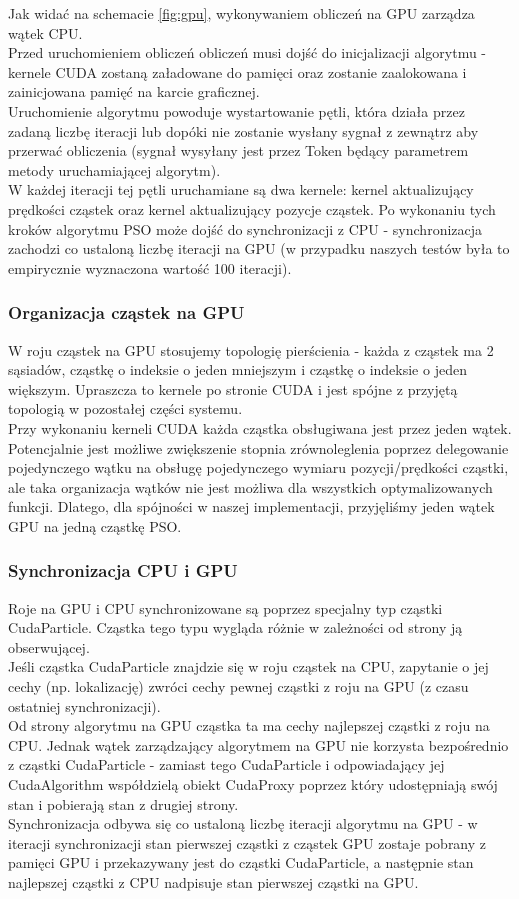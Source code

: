 \documentclass[12pt, twoside, openany, abstract=on]{report}
\theoremstyle{definition}
\begin{document}
  
Jak widać na schemacie \ref{fig:gpu}, wykonywaniem obliczeń na GPU zarządza wątek CPU. \\ 
Przed uruchomieniem obliczeń obliczeń musi dojść do inicjalizacji algorytmu - kernele CUDA zostaną załadowane do pamięci oraz zostanie zaalokowana i zainicjowana pamięć na karcie graficznej. \\
Uruchomienie algorytmu powoduje wystartowanie pętli, która działa przez zadaną liczbę iteracji lub dopóki nie zostanie wysłany sygnał z zewnątrz aby przerwać obliczenia (sygnał wysyłany jest przez Token będący parametrem metody uruchamiającej algorytm). \\
W każdej iteracji tej pętli uruchamiane są dwa kernele: kernel aktualizujący prędkości cząstek oraz kernel aktualizujący pozycje cząstek. Po wykonaniu tych kroków algorytmu PSO może dojść do synchronizacji z CPU - synchronizacja zachodzi co ustaloną liczbę iteracji na GPU (w przypadku naszych testów była to empirycznie wyznaczona wartość 100 iteracji).

\subsubsection{Organizacja cząstek na GPU}
W roju cząstek na GPU stosujemy topologię pierścienia - każda z cząstek ma 2 sąsiadów, cząstkę o indeksie o jeden mniejszym i cząstkę o indeksie o jeden większym. Upraszcza to kernele po stronie CUDA i jest spójne z przyjętą topologią w pozostałej części systemu. \\
Przy wykonaniu kerneli CUDA każda cząstka obsługiwana jest przez jeden wątek. Potencjalnie jest możliwe zwiększenie stopnia zrównoleglenia poprzez delegowanie pojedynczego wątku na obsługę pojedynczego wymiaru pozycji/prędkości cząstki, ale taka organizacja wątków nie jest możliwa dla wszystkich optymalizowanych funkcji. Dlatego, dla spójności w naszej implementacji, przyjęliśmy jeden wątek GPU na jedną cząstkę PSO.

\subsubsection{Synchronizacja CPU i GPU}
Roje na GPU i CPU synchronizowane są poprzez specjalny typ cząstki CudaParticle. Cząstka tego typu wygląda różnie w zależności od strony ją obserwującej. \\
Jeśli cząstka CudaParticle znajdzie się w roju cząstek na CPU, zapytanie o jej cechy (np. lokalizację) zwróci cechy pewnej cząstki z roju na GPU (z czasu ostatniej synchronizacji).  \\
Od strony algorytmu na GPU cząstka ta ma cechy najlepszej cząstki z roju na CPU. Jednak wątek zarządzający algorytmem na GPU nie korzysta bezpośrednio z cząstki CudaParticle - zamiast tego CudaParticle i odpowiadający jej CudaAlgorithm współdzielą obiekt CudaProxy poprzez który udostępniają swój stan i pobierają stan z drugiej strony. \\
Synchronizacja odbywa się co ustaloną liczbę iteracji algorytmu na GPU - w iteracji synchronizacji stan pierwszej cząstki z cząstek GPU zostaje pobrany z pamięci GPU i przekazywany jest do cząstki CudaParticle, a następnie stan najlepszej cząstki z CPU nadpisuje stan pierwszej cząstki na GPU. 
  
\end{document}
